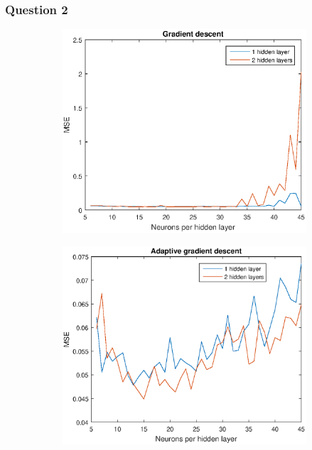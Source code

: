 \documentclass{article}
\begin{document}
\subsubsection*{Question 2}
\begin{figure}
 \centering
 \begin{subfigure}[b]{.8\textwidth}
   \includegraphics[width=\textwidth]{traingd_plot.eps}
 \end{subfigure}
 \begin{subfigure}[b]{.8\textwidth}
   \includegraphics[width=\textwidth]{traingda_plot.eps}
 \end{subfigure}
\end{figure}
\end{document}
